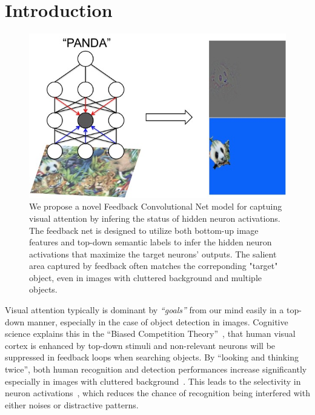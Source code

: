 \section{Introduction}

\begin{center}
\end{center}

\setlength{\tabcolsep}{2pt}
\begin{figure}[htb]
\begin{center}
\includegraphics[width=0.95\columnwidth]{figs/splash/splash}
\caption{We propose a novel Feedback Convolutional Net model for captuing visual attention by infering the status of hidden neuron activations. The feedback net is designed to utilize both bottom-up image features and top-down semantic labels to infer the hidden neuron activations that maximize the target neurons' outputs. The salient area captured by feedback often matches the correponding "target" object, even in images with cluttered background and multiple objects.}
\label{fig:splash0}
\vspace{-10pt}
\end{center}
\end{figure}

Visual attention typically is dominant by \emph{``goals''} from our mind easily in a top-down manner, especially in the case of object detection in images. Cognitive science explains this in the ``Biased Competition Theory''~\cite{beck2009top,desimone1998visual,desimone1995neural}, that human visual cortex is enhanced by top-down stimuli and non-relevant neurons will be suppressed in feedback loops when searching objects. By ``looking and thinking twice'', both human recognition and detection performances increase significantly especially in images with cluttered background~\cite{Cichy2014Resolving}. This leads to the selectivity in neuron activations~\cite{Kruger2013Deep}, which reduces the chance of recognition being interfered with either noises or distractive patterns.


